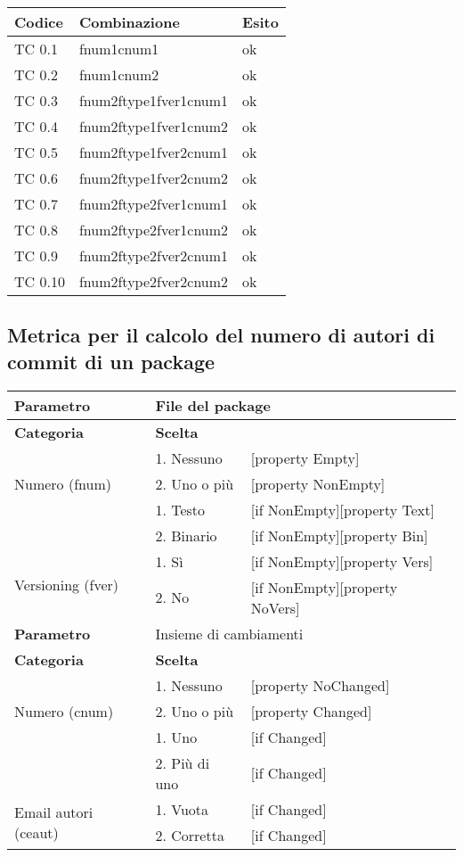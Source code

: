 \begin{tabular}{|p{3cm}|p{7cm}|p{3cm}|}
	\hline
	\rowcolor{Gray}
	\textbf{Codice} & \textbf{Combinazione} & \textbf{Esito}\tabularnewline
	\hline
	TC 0.1			& fnum1cnum1			& ok \tabularnewline
	\hline
	TC 0.2			& fnum1cnum2			& ok \tabularnewline
	\hline
	TC 0.3			& fnum2ftype1fver1cnum1		& ok \tabularnewline
	\hline
	TC 0.4			& fnum2ftype1fver1cnum2		& ok \tabularnewline
	\hline
	TC 0.5			& fnum2ftype1fver2cnum1		& ok \tabularnewline
	\hline
	TC 0.6			& fnum2ftype1fver2cnum2		& ok \tabularnewline
	\hline
	TC 0.7			& fnum2ftype2fver1cnum1		& ok \tabularnewline
	\hline
	TC 0.8			& fnum2ftype2fver1cnum2		& ok \tabularnewline
	\hline
	TC 0.9			& fnum2ftype2fver2cnum1		& ok \tabularnewline
	\hline
	TC 0.10			&fnum2ftype2fver2cnum2		& ok \tabularnewline
	\hline
\end{tabular}
\clearpage




\subsection{Metrica per il calcolo del numero di autori di commit di un package}

\begin{tabular}{|p{4cm}|p{4cm}p{5cm}|}
	\hline
	\cellcolor{Gray} \textbf{Parametro}				& \multicolumn{2}{l|}{File del package}							\tabularnewline
	\hline
	\rowcolor{Gray}
	\textbf{Categoria}						& \textbf{Scelta}			&						\tabularnewline
	\hline
	\multirow{3}{*}{Numero (fnum)}					& 1. Nessuno				&	[property Empty] 			\tabularnewline
									\cline{2-3}
									& 2. Uno o più				&	[property NonEmpty]			\tabularnewline
	\hline
	\multirow{2}{*}{Tipo (ftype)}					& 1. Testo				&	[if NonEmpty][property Text] 		\tabularnewline
									\cline{2-3}
									& 2. Binario				&	[if NonEmpty][property Bin]		\tabularnewline
	\hline
	\multirow{2}{*}{Versioning (fver)}				& 1. Sì					&	[if NonEmpty][property Vers] 		\tabularnewline
									\cline{2-3}
									& 2. No					&	[if NonEmpty][property NoVers]		\tabularnewline
	\hline
	
	\cellcolor{Gray} \textbf{Parametro}				& \multicolumn{2}{l|}{Insieme di cambiamenti}						\tabularnewline
	\hline
	\rowcolor{Gray}
	\textbf{Categoria}						& \textbf{Scelta}			&						\tabularnewline
	\hline
	\multirow{3}{*}{Numero (cnum)}					& 1. Nessuno				&	[property NoChanged] 			\tabularnewline
									\cline{2-3}
									& 2. Uno o più				&	[property Changed]			\tabularnewline
	\hline
	\multirow{2}{*}{Numero autori (cnaut)}				& 1. Uno				&	[if Changed]				\tabularnewline
									\cline{2-3}
									& 2. Più di uno				&	[if Changed]				\tabularnewline
	\hline
	\multirow{2}{*}{Email autori (ceaut)}				& 1. Vuota				&	[if Changed]				\tabularnewline
									\cline{2-3}
									& 2. Corretta				&	[if Changed]				\tabularnewline
	\hline
\end{tabular}

